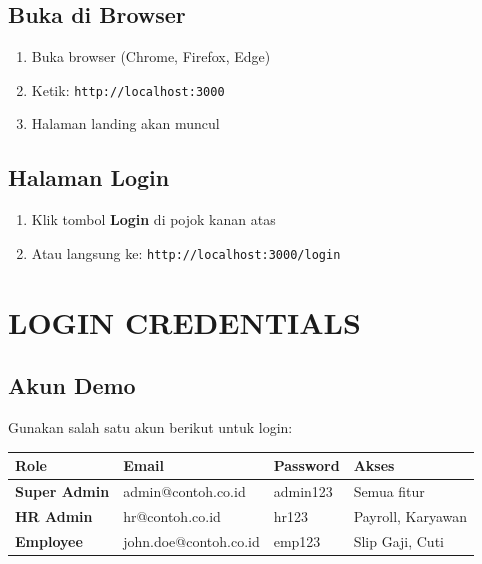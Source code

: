 \documentclass[12pt,a4paper]{article}
\begin{document}
\subsection{Buka di Browser}

\begin{enumerate}
    \item Buka browser (Chrome, Firefox, Edge)
    \item Ketik: \texttt{http://localhost:3000}
    \item Halaman landing akan muncul
\end{enumerate}

\subsection{Halaman Login}

\begin{enumerate}
    \item Klik tombol \textbf{Login} di pojok kanan atas
    \item Atau langsung ke: \texttt{http://localhost:3000/login}
\end{enumerate}

\newpage
\section{LOGIN CREDENTIALS}

\subsection{Akun Demo}

Gunakan salah satu akun berikut untuk login:

\begin{center}
\begin{tabular}{|l|l|l|l|}
    \hline
    \textbf{Role} & \textbf{Email} & \textbf{Password} & \textbf{Akses} \\
    \hline
    \rowcolor{gray!20}
    \textbf{Super Admin} & admin@contoh.co.id & admin123 & Semua fitur \\
    \textbf{HR Admin} & hr@contoh.co.id & hr123 & Payroll, Karyawan \\
    \rowcolor{gray!20}
    \textbf{Employee} & john.doe@contoh.co.id & emp123 & Slip Gaji, Cuti \\
    \hline
\end{tabular}
\end{center}
\end{document}
